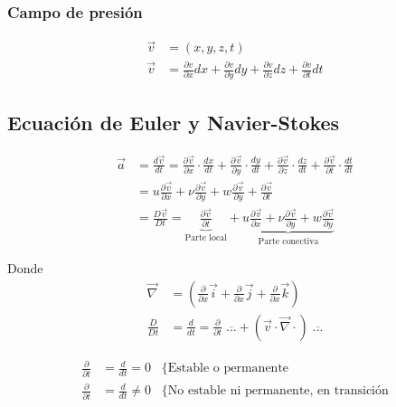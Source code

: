\subsubsection{Campo de presión}


\[
    \begin{split}
        \Vec{v} & = (x, y, z, t) \\
        \Vec{v} & = \frac{ \partial v }{ \partial x } dx + \frac{ \partial v }{ \partial y } dy + \frac{ \partial v }{ \partial z } dz + \frac{ \partial v }{ \partial t } dt
    \end{split}
\]

\subsection{Ecuación de Euler y Navier-Stokes}
\[
    \begin{split}
        \vec{a} & = \frac{ d\vec{v} }{ dt } = \frac{ \partial \vec{v} }{ \partial x } \cdot \frac{ dx }{ dt } + \frac{ \partial \vec{v} }{ \partial y } \cdot \frac{ dy }{ dt } + \frac{ \partial \vec{v} }{ \partial z } \cdot \frac{ dz }{ dt } +\frac{ \partial \vec{v} }{ \partial t } \cdot \frac{ dt }{ dt } \\
        & = u \frac{ \partial \vec{v} }{ \partial x } + \nu \frac{ \partial \vec{v} }{ \partial y } + w \frac{ \partial \vec{v} }{ \partial y } + \frac{ \partial \vec{v} }{ \partial t } \\
        & = \frac{ D \vec{v} }{ Dt } = \underbrace{ \frac{ \partial \vec{v} }{ \partial t } }_{ \text{Parte local} } + \underbrace{ u \frac{ \partial \vec{v} }{ \partial x } + \nu \frac{ \partial \vec{v} }{ \partial y } + w \frac{ \partial \vec{v} }{ \partial y } }_{ \text{Parte conectiva} }
    \end{split} 
\]

Donde 
\[
    \begin{split}
        \vec{ \nabla } & = ( \frac{ \partial }{ \partial x } \vec{i} + \frac{ \partial }{ \partial x } \vec{j} + \frac{ \partial }{ \partial x } \vec{k} ) \\
        \frac{ D }{ Dt } & = \frac{ d }{ dt } = \frac{ \partial }{ \partial t } \; \overline{{.}{.}{.}} + ( \vec{v} \cdot \vec{ \nabla } \cdot ) \; \overline{{.}{.}{.}}
    \end{split}
\]

\[
    \begin{split}
        \frac{ \partial }{ \partial t } & = \frac{ d }{ dt } = 0 \;\;\; \Big\{ \text{Estable o permanente} \\
        \frac{ \partial }{ \partial t } & = \frac{ d }{ dt } \not = 0 \;\;\; \Big\{ \text{No estable ni permanente, en transición}
    \end{split}
\]

